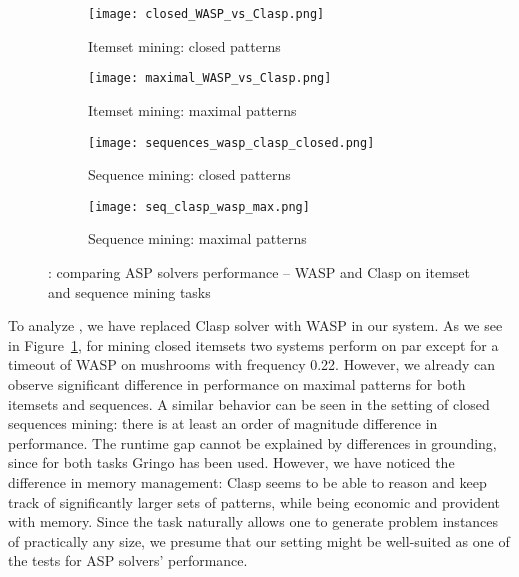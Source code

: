 \begin{figure}[tb]
  \centering
  \begin{subfigure}[t]{0.49\textwidth}
   \texttt{[image: closed\_WASP\_vs\_Clasp.png]}
   \caption{Itemset mining: closed patterns}
    \label{fig:itemset_wasp_closed_comparison}
  \end{subfigure}
 \hfill
  \begin{subfigure}[t]{0.49\textwidth}
   \texttt{[image: maximal\_WASP\_vs\_Clasp.png]}
   \caption{Itemset mining: maximal patterns} 
   \label{fig:itemset_wasp_max_comparison}
  \end{subfigure}
 \hfill
  \begin{subfigure}[t]{0.49\textwidth}
   \texttt{[image: sequences\_wasp\_clasp\_closed.png]}
	\caption{Sequence mining: closed patterns}
	\label{fig:seq_wasp_closed_comparison}
  \end{subfigure}
\hfill
  \begin{subfigure}[t]{0.49\textwidth}
   \texttt{[image: seq\_clasp\_wasp\_max.png]}
   \caption{Sequence mining: maximal patterns}
    \label{fig:seq_wasp_max_comparison}
  \end{subfigure}
    \label{fig:wasp_comparison}
	\caption{\qfour: comparing ASP solvers performance -- WASP and Clasp on itemset and sequence mining tasks}
\end{figure}


To analyze \qfour, we have replaced Clasp solver with WASP \parencite{wasp} in our system. As we see in Figure~\ref{fig:itemset_wasp_closed_comparison}, for mining closed itemsets two systems perform on par except for a timeout of WASP on mushrooms with frequency 0.22. However, we already can observe significant difference in performance on maximal patterns for both itemsets and sequences. A similar behavior can be seen in the setting of closed sequences mining: there is at least an order of magnitude difference in performance. The runtime gap cannot be explained by differences in grounding, since for both tasks Gringo has been used. However, we have noticed the difference in memory management: Clasp seems to be able to reason and keep track of significantly larger sets of patterns, while being economic and provident with memory. Since the task naturally allows one to generate problem instances of practically any size, we presume that our setting might be well-suited as one of the tests for ASP solvers' performance.

